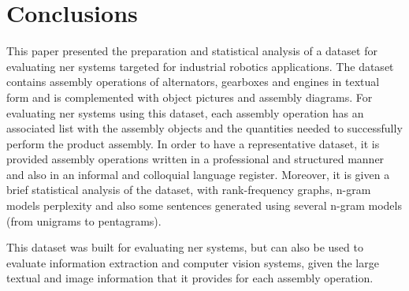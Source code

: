 \section{Conclusions}\label{sec:conclusions}

This paper presented the preparation and statistical analysis of a dataset for evaluating \gls{ner} systems targeted for industrial robotics applications. The dataset contains assembly operations of alternators, gearboxes and engines in textual form and is complemented with object pictures and assembly diagrams. For evaluating \gls{ner} systems using this dataset, each assembly operation has an associated list with the assembly objects and the quantities needed to successfully perform the product assembly. In order to have a representative dataset, it is provided assembly operations written in a professional and structured manner and also in an informal and colloquial language register. Moreover, it is given a brief statistical analysis of the dataset, with rank-frequency graphs, n-gram models perplexity and also some sentences generated using several n-gram models (from unigrams to pentagrams).

This dataset was built for evaluating \gls{ner} systems, but can also be used to evaluate information extraction and computer vision systems, given the large textual and image information that it provides for each assembly operation.
